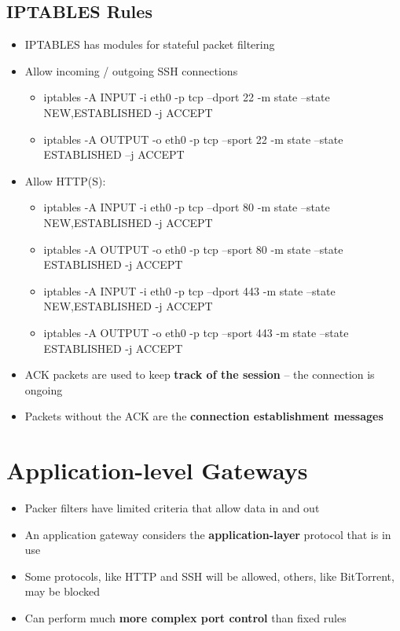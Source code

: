 \documentclass{article}
\begin{document}
\subsection{IPTABLES Rules}
\begin{itemize}
  \item IPTABLES has modules for stateful packet filtering 
  \item Allow incoming / outgoing SSH connections
  \begin{itemize}
    \item iptables -A INPUT -i eth0 -p tcp --dport 22 -m state --state NEW,ESTABLISHED -j ACCEPT
    \item iptables -A OUTPUT -o eth0 -p tcp --sport 22 -m state --state ESTABLISHED –j ACCEPT
  \end{itemize}
  \item Allow HTTP(S):
  \begin{itemize}
    \item iptables -A INPUT -i eth0 -p tcp --dport 80 -m state --state NEW,ESTABLISHED -j ACCEPT
    \item iptables -A OUTPUT -o eth0 -p tcp --sport 80 -m state --state ESTABLISHED -j ACCEPT
    \item iptables -A INPUT -i eth0 -p tcp --dport 443 -m state --state NEW,ESTABLISHED -j ACCEPT
    \item iptables -A OUTPUT -o eth0 -p tcp --sport 443 -m state --state ESTABLISHED -j ACCEPT
  \end{itemize}
  \item ACK packets are used to keep \textbf{track of the session} – the connection is ongoing 
  \item Packets without the ACK are the \textbf{connection establishment messages}
\end{itemize}

\section{Application-level Gateways}
\begin{itemize}
  \item Packer filters have limited criteria that allow data in and out 
  \item An application gateway considers the \textbf{application-layer} protocol that is in use 
  \item Some protocols, like HTTP and SSH will be allowed, others, like BitTorrent, may be blocked 
  \item Can perform much \textbf{more complex port control} than fixed rules
\end{itemize}
\end{document}

